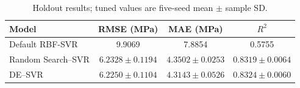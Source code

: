 \begin{table}[htbp]\centering\caption{Holdout results; tuned values are five-seed mean $\pm$ sample SD.}\label{tab:metrics}\begin{tabularx}{\textwidth}{lCCC}\toprule Model&RMSE (MPa)&MAE (MPa)&$R^2$\\\midrule
Default RBF-SVR & 9.9069 & 7.8854 & 0.5755\\
Random Search--SVR & $6.2328\pm0.1194$ & $4.3502\pm0.0253$ & $0.8319\pm0.0064$\\
DE--SVR & $6.2250\pm0.1104$ & $4.3143\pm0.0526$ & $0.8324\pm0.0060$\\\bottomrule\end{tabularx}\end{table}

